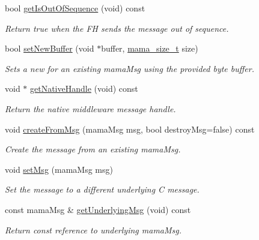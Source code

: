 \begin{DoxyCompactItemize}
bool \hyperlink{classWombat_1_1MamaMsg_a2b01886c287dd83c9b9a9aa20a9d9267}{getIsOutOfSequence} (void) const 
\begin{DoxyCompactList}\small\item\em Return true when the FH sends the message out of sequence. \item\end{DoxyCompactList}\item 
bool \hyperlink{classWombat_1_1MamaMsg_acd0564688af724fd2d1f245a785da0ba}{setNewBuffer} (void $\ast$buffer, \hyperlink{classmama__size__t}{mama\_\-size\_\-t} size)
\begin{DoxyCompactList}\small\item\em Sets a new for an existing mamaMsg using the provided byte buffer. \item\end{DoxyCompactList}\item 
void $\ast$ \hyperlink{classWombat_1_1MamaMsg_ae8733094602de66fa1e886e7f2b2c0d0}{getNativeHandle} (void) const 
\begin{DoxyCompactList}\small\item\em Return the native middleware message handle. \item\end{DoxyCompactList}\item 
void \hyperlink{classWombat_1_1MamaMsg_a4dfe79770a6a552e2b4592af021a63ca}{createFromMsg} (mamaMsg msg, bool destroyMsg=false) const 
\begin{DoxyCompactList}\small\item\em Create the message from an existing mamaMsg. \item\end{DoxyCompactList}\item 
void \hyperlink{classWombat_1_1MamaMsg_abe271a7c85f9384143c4a4d9ac51d7df}{setMsg} (mamaMsg msg)
\begin{DoxyCompactList}\small\item\em Set the message to a different underlying C message. \item\end{DoxyCompactList}\item 
const mamaMsg \& \hyperlink{classWombat_1_1MamaMsg_ad2f5fc395e464a7042e30e74e411bc2e}{getUnderlyingMsg} (void) const 
\begin{DoxyCompactList}\small\item\em Return const reference to underlying mamaMsg. \item\end{DoxyCompactList}\item 

\end{DoxyCompactItemize}
